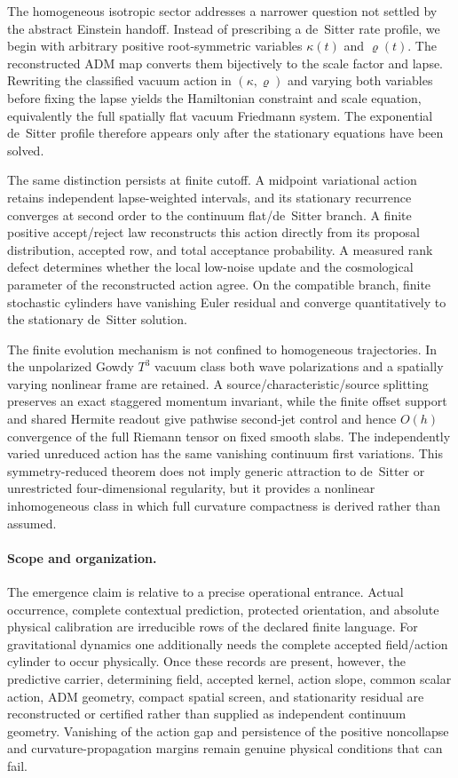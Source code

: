 \documentclass[11pt]{article}
\theoremstyle{definition}
\theoremstyle{remark}
\begin{document}
The homogeneous isotropic sector addresses a narrower question not settled by
the abstract Einstein handoff.  Instead of prescribing a de~Sitter rate
profile, we begin with arbitrary positive root-symmetric variables
$\kappa(t)$ and $\varrho(t)$.  The reconstructed ADM map converts them
bijectively to the scale factor and lapse.  Rewriting the classified vacuum
action in $(\kappa,\varrho)$ and varying both variables before fixing the lapse
yields the Hamiltonian constraint and scale equation, equivalently the full
spatially flat vacuum Friedmann system.  The exponential de~Sitter profile
therefore appears only after the stationary equations have been solved.

The same distinction persists at finite cutoff.  A midpoint variational action
retains independent lapse-weighted intervals, and its stationary recurrence
converges at second order to the continuum flat/de~Sitter branch.  A finite
positive accept/reject law reconstructs this action directly from its proposal
distribution, accepted row, and total acceptance probability.  A measured rank
defect determines whether the local low-noise update and the cosmological
parameter of the reconstructed action agree.  On the compatible branch, finite
stochastic cylinders have vanishing Euler residual and converge quantitatively
to the stationary de~Sitter solution.

The finite evolution mechanism is not confined to homogeneous trajectories.
In the unpolarized Gowdy $T^3$ vacuum class both wave polarizations and a
spatially varying nonlinear frame are retained.  A
source/characteristic/source splitting preserves an exact staggered momentum
invariant, while the finite offset support and shared Hermite readout give
pathwise second-jet control and hence $O(h)$ convergence of the full Riemann
tensor on fixed smooth slabs.  The independently varied unreduced action has
the same vanishing continuum first variations.  This symmetry-reduced theorem
does not imply generic attraction to de~Sitter or unrestricted four-dimensional
regularity, but it provides a nonlinear inhomogeneous class in which full
curvature compactness is derived rather than assumed.

\paragraph{Scope and organization.}
The emergence claim is relative to a precise operational entrance.  Actual
occurrence, complete contextual prediction, protected orientation, and
absolute physical calibration are irreducible rows of the declared finite
language.  For gravitational dynamics one additionally needs the complete
accepted field/action cylinder to occur physically.  Once these records are
present, however, the predictive carrier, determining field, accepted kernel,
action slope, common scalar action, ADM geometry, compact spatial screen, and
stationarity residual are reconstructed or certified rather than supplied as
independent continuum geometry.  Vanishing of the action gap and persistence
of the positive noncollapse and curvature-propagation margins remain genuine
physical conditions that can fail.
\end{document}
